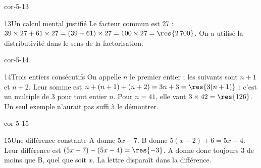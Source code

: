 \begin{blocLivre}{cor-5-13}\begin{corrige}{13}{Un calcul mental justifié}
Le facteur commun est 27 : $39\times27+61\times27=(39+61)\times27=100\times27=\res{2\,700}$. On a utilisé la distributivité dans le sens de la factorisation.
\end{corrige}\end{blocLivre}
\begin{blocLivre}{cor-5-14}\begin{corrige}{14}{Trois entiers consécutifs}
On appelle $n$ le premier entier ; les suivants sont $n+1$ et $n+2$. Leur somme est $n+(n+1)+(n+2)=3n+3=\res{3(n+1)}$ : c’est un multiple de 3 pour tout entier $n$. Pour $n=41$, elle vaut $3\times42=\res{126}$. Un seul exemple n’aurait pas suffi à le démontrer.
\end{corrige}\end{blocLivre}
\begin{blocLivre}{cor-5-15}\begin{corrige}{15}{Une différence constante}
A donne $5x-7$. B donne $5(x-2)+6=5x-4$. Leur différence est $(5x-7)-(5x-4)=\res{-3}$. A donne donc toujours 3 de moins que B, quel que soit $x$. La lettre disparaît dans la différence.
\end{corrige}\end{blocLivre}
